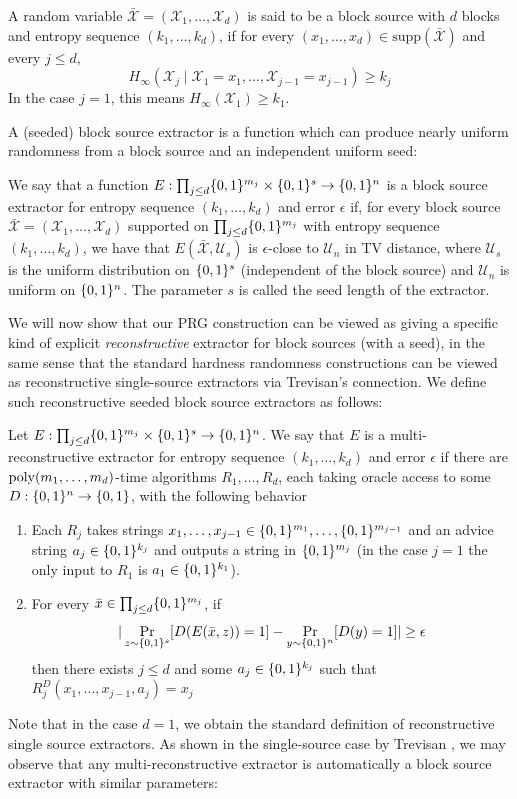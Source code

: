 \begin{definition}
A random variable $\bar{\mathcal{X}}=(\mathcal{X}_1,\ldots,\mathcal{X}_d)$ is said to be a block source with $d$ blocks and entropy sequence $(k_1,\ldots,k_d)$, if for every $(x_1,\ldots,x_d) \in \mathrm{supp}(\bar{\mathcal{X}})$ and every $j \leq d$, 
\[
H_{\infty}(\mathcal{X}_{j} \mid \mathcal{X}_1 = x_1,\ldots, \mathcal{X}_{j-1}=x_{j-1}) \geq k_j
\]
In the case $j=1$, this means $H_{\infty}(\mathcal{X}_1) \geq k_1$.
\end{definition}
A (seeded) block source extractor is a function which can produce nearly uniform randomness from a block source and an independent uniform seed:
\begin{definition}
We say that a function $E: \prod_{j \leq d} \{0,1\}^{m_j} \times \{0,1\}^s \to \{0,1\}^n$ is a block source extractor for entropy sequence $(k_1,\ldots,k_d)$ and error $\epsilon$ if, for every block source $\bar{\mathcal{X}} = (\mathcal{X}_1,\ldots,\mathcal{X}_d)$ supported on $\prod_{j \leq d} \{0,1\}^{m_j}$ with entropy sequence $(k_1,\ldots,k_d)$, we have that $E(\bar{\mathcal{X}}, \mathcal{U}_s)$ is $\epsilon$-close to $\mathcal{U}_n$ in TV distance, where $\mathcal{U}_s$ is the uniform distribution on $\{0,1\}^s$ (independent of the block source) and $\mathcal{U}_n$ is uniform on $\{0,1\}^n$. The parameter $s$ is called the seed length of the extractor. 
\end{definition}
We will now show that our PRG construction can be viewed as giving a specific kind of explicit \emph{reconstructive} extractor for block sources (with a seed), in the same sense that the standard hardness randomness constructions can be viewed as reconstructive single-source extractors via Trevisan's connection. We define such reconstructive seeded block source extractors as follows:
\begin{definition}
Let $E: \prod_{j \leq d} \{0,1\}^{m_j} \times \{0,1\}^{s} \to \{0,1\}^n$. We say that $E$ is a multi-reconstructive extractor for entropy sequence $(k_1,\ldots,k_d)$ and error $\epsilon$ if there are $\mathrm{poly}(m_1,\ldots,m_d)$-time algorithms $R_1,\ldots,R_d$, each taking oracle access to some $D: \{0,1\}^n \to \{0,1\}$, with the following behavior
\begin{enumerate}
	\item Each $R_j$ takes strings $x_1,\ldots,x_{j-1} \in \{0,1\}^{m_1},\ldots,\{0,1\}^{m_{j-1}}$ and an advice string $a_j \in  \{0,1\}^{k_j}$ and outputs a string in $\{0,1\}^{m_j}$ (in the case $j=1$ the only input to $R_1$ is $a_1\in \{0,1\}^{k_1}$).
	\item For every $\bar{x} \in \prod_{j \leq d} \{0,1\}^{m_j}$, if 
\[
|\Pr_{z \sim \{0,1\}^s}[D( E(\bar{x}, z)) = 1] - \Pr_{y \sim \{0,1\}^n} [D(y) = 1]| \geq \epsilon
\]
then there exists $j \leq d$ and some $a_j \in \{0,1\}^{k_j}$ such that $R^D_j(x_1,\ldots,x_{j-1},a_j) = x_j$
\end{enumerate}
\end{definition}
Note that in the case $d=1$, we obtain the standard definition of reconstructive single source extractors. As shown in the single-source case by Trevisan \cite{trevisan}, we may observe that any multi-reconstructive extractor is automatically a block source extractor with similar parameters:


